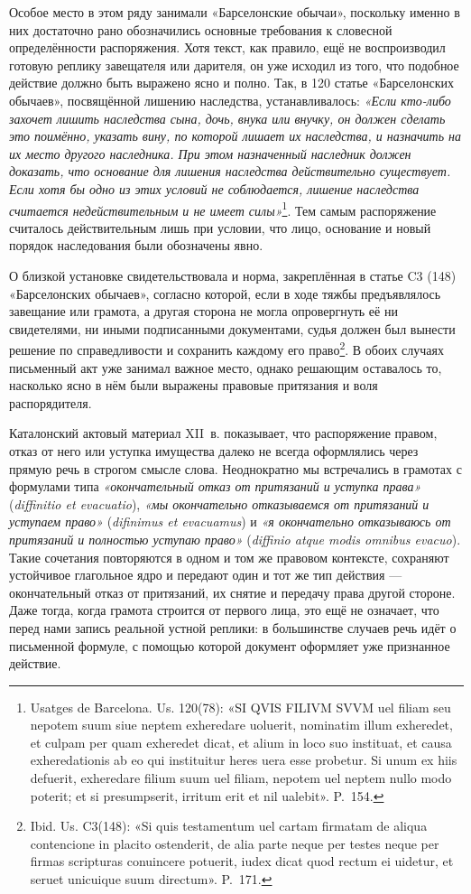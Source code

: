 Особое место в этом ряду занимали «Барселонские обычаи», поскольку именно в них достаточно рано обозначились основные требования к словесной определённости распоряжения. Хотя текст, как правило, ещё не воспроизводил готовую реплику завещателя или дарителя, он уже исходил из того, что подобное действие должно быть выражено ясно и полно. Так, в 120 статье «Барселонских обычаев», посвящённой лишению наследства, устанавливалось: \emph{«Если кто-либо захочет лишить наследства сына, дочь, внука или внучку, он должен сделать это поимённо, указать вину, по которой лишает их наследства, и назначить на их место другого наследника}\emph{. П}\emph{ри этом назначенный наследник должен доказать, что основание для лишения наследства действительно существует. Если хотя бы одно из этих условий не соблюдается, лишение наследства считается недействительным и не имеет силы»}\footnote{Usatges de Barcelona. Us. 120(78): «SI QVIS FILIVM SVVM uel filiam seu nepotem suum siue neptem exheredare uoluerit, nominatim illum exheredet, et culpam per quam exheredet dicat, et alium in loco suo instituat, et causa exheredationis ab eo qui instituitur heres uera esse probetur. Si unum ex hiis defuerit, exheredare filium suum uel filiam, nepotem uel neptem nullo modo poterit; et si presumpserit, irritum erit et nil ualebit». P.~154.}. Тем самым распоряжение считалось действительным лишь при условии, что лицо, основание и новый порядок наследования были обозначены явно.

О близкой установке свидетельствовала и норма, закреплённая в статье C3 (148) «Барселонских обычаев», согласно которой, если в ходе тяжбы предъявлялось завещание или грамота, а другая сторона не могла опровергнуть её ни свидетелями, ни иными подписанными документами, судья должен был вынести решение по справедливости и сохранить каждому его право\footnote{Ibid. Us. C3(148): «Si quis testamentum uel cartam firmatam de aliqua contencione in placito ostenderit, de alia parte neque per testes neque per firmas scripturas conuincere potuerit, iudex dicat quod rectum ei uidetur, et seruet unicuique suum directum». P.~171.}. В обоих случаях письменный акт уже занимал важное место, однако решающим оставалось то, насколько ясно в нём были выражены правовые притязания и воля распорядителя.

Каталонский актовый материал XII~в. показывает, что распоряжение правом, отказ от него или уступка имущества далеко не всегда оформлялись через прямую речь в строгом смысле слова. Неоднократно мы встречались в грамотах с формулами типа \emph{«окончательный отказ от притязаний и уступка права»} (\emph{diffinitio et evacuatio}), \emph{«мы окончательно отказываемся от притязаний и уступаем право» }(\emph{difinimus et evacuamus}) и \emph{«я окончательно отказываюсь от притязаний и полностью уступаю право»} (\emph{diffinio atque modis omnibus evacuo}). Такие сочетания повторяются в одном и том же правовом контексте, сохраняют устойчивое глагольное ядро и передают один и тот же тип действия --- окончательный отказ от притязаний, их снятие и передачу права другой стороне. Даже тогда, когда грамота строится от первого лица, это ещё не означает, что перед нами запись реальной устной реплики: в большинстве случаев речь идёт о письменной формуле, с помощью которой документ оформляет уже признанное действие.

